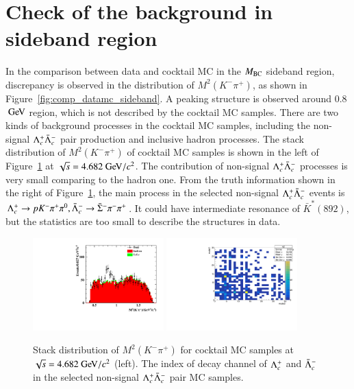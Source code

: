 \section{Check of the background in sideband region}
\label{app:bkg_check}

In the comparison between data and cocktail MC in the $M_{\rm{BC}}$ sideband region, discrepancy is observed in the distribution of $M^2(K^-\pi^+)$, as shown in Figure~\ref{fig:comp_datamc_sideband}.
A peaking structure is observed around 0.8 $\gev$ region, which is not described by the cocktail MC samples. There are two kinds of background processes in the cocktail MC samples, including the non-signal $\Lambda_{c}^{+}\bar{\Lambda}_{c}^{-}$ pair production and inclusive hadron processes. The stack distribution of $M^2(K^-\pi^+)$ of cocktail MC samples is shown in the left of Figure~\ref{fig:bkg_cocktail} at $\sqrt{s} = 4.682\gev/c^2$. The contribution of non-signal $\Lambda_{c}^{+}\bar{\Lambda}_{c}^{-}$ processes is very small comparing to the hadron one. From the truth information shown in the right of Figure~\ref{fig:bkg_cocktail}, the main process in the selected non-signal $\Lambda_{c}^{+}\bar{\Lambda}_{c}^{-}$ events is $\Lambda_{c}^{+} \rightarrow p K^-\pi^+\pi^0, \bar{\Lambda}_{c}^{-} \rightarrow \bar{\Sigma}^-\pi^-\pi^+$. It could have intermediate resonance of $\bar{K}^*(892)$, but the statistics are too small to describe the structures in data.

\begin{figure}[h]\centering
    \includegraphics[width=0.45\textwidth]{figure/app_bkg/output_mc_0_sideband_stack_m2_23_2c_1.pdf}
    \includegraphics[width=0.45\textwidth]{figure/app_bkg/lclc_bkg_mode.pdf}
    \caption{Stack distribution of $M^2(K^-\pi^+)$ for cocktail MC samples at $\sqrt{s} = 4.682\gev/c^2$ (left). The index of decay channel of $\Lambda_{c}^{+}$ and $\bar{\Lambda}_{c}^{-}$ in the selected non-signal $\Lambda_{c}^{+}\bar{\Lambda}_{c}^{-}$ pair MC samples.}
\label{fig:bkg_cocktail} 
\end{figure}

